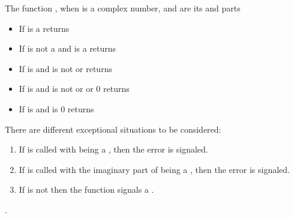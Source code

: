 \documentclass[../Exponentials-Logarithms-Trigonometry.tex]{subfiles}
\begin{document}
    \noindent
    The function , when  is a complex number, 
    and  are its  and  parts
    \begin{itemize}
        \item If  is a  returns 
        \code{))}
        \item If  is not a  and  is a
         returns 
        \item If  is  and
         is not  or 
        returns \code{)))}
        \item If  is  and
         is not  or  or $0$
        returns \code{)))}
        \item If  is  and  is $0$
        returns 
    \end{itemize}

    \DExceptional{}

    There are different exceptional situations to be considered:
    \begin{enumerate}
        \item If  is called with
         being a , then the
         error is signaled.
        \item If  is called with the imaginary
        part of  being a , then the
         error is signaled.
        \item If  is not \CL{}
         then the function  signals a
        .
    \end{enumerate}

    \DSeeAlso{}

    .
\end{document}
